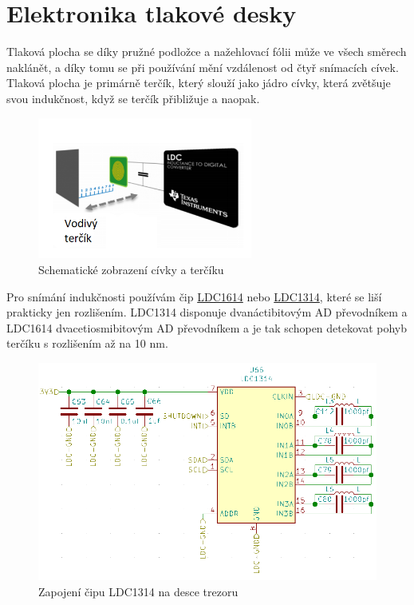 \section{Elektronika tlakové desky}
\label{E4-tlakovka}
Tlaková plocha se díky pružné podložce a nažehlovací fólii může ve všech směrech naklánět, a díky tomu se při používání mění vzdálenost od čtyř snímacích
cívek. Tlaková plocha je primárně terčík, který slouží jako jádro cívky, která zvětšuje svou indukčnost, když se terčík přibližuje a naopak.

\begin{figure}[htbp]
    \centering
    \includegraphics[width=200pt]{kapitoly/obrazky/E4/elektronika_tlakove_desky/civka_tercik_LDC.png}
    \caption{Schematické zobrazení cívky a terčíku \parencite{LDC-cd1}}
    \label{fig:E4-sch_civka_tercik}
\end{figure}

Pro snímání indukčnosti používám čip \href{https://www.ti.com/lit/ds/symlink/ldc1612.pdf?ts=1612018658531&ref_url=https%253A%252F%252Fwww.google.com%252F}{LDC1614} \parencite{LDC1614}
nebo \href{https://www.ti.com/lit/ds/symlink/ldc1312.pdf?ts=1612017390818&ref_url=https%253A%252F%252Fwww.google.com%252F}{LDC1314}, 
které se liší prakticky jen rozlišením. LDC1314 disponuje dvanáctibitovým AD převodníkem a LDC1614 dvacetiosmibitovým AD převodníkem 
a je tak schopen detekovat pohyb terčíku s rozlišením až na 10 nm.

\begin{figure}[htbp]
    \centering
    \includegraphics[width=\textwidth]{kapitoly/obrazky/E4/elektronika_tlakove_desky/moje_zapojeni.png}
    \caption{Zapojení čipu LDC1314 na desce trezoru}
    \label{fig:E4-LDC}
\end{figure}

